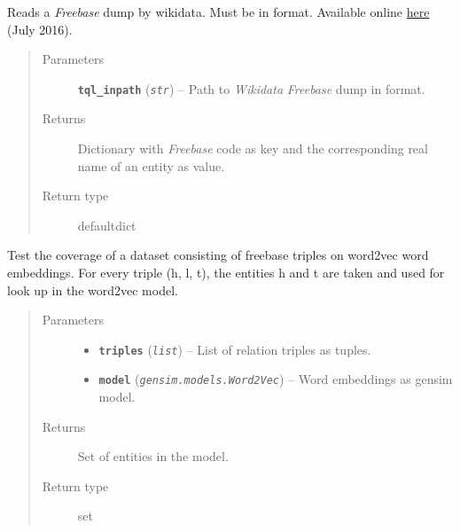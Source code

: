 \documentclass[letterpaper,10pt,english]{sphinxmanual}
\begin{document}

\begin{fulllineitems}
\label{src.trans_e:src.trans_e.trans_we.read_tql_file}
Reads a \emph{Freebase} dump by wikidata. Must be in  format. Available online
\href{https://developers.google.com/freebase/}{here} (July 2016).
\begin{quote}\begin{description}
\item[{Parameters}] \leavevmode
\textbf{\texttt{tql\_inpath}} (\emph{\texttt{str}}) -- Path to \emph{Wikidata} \emph{Freebase} dump in  format.

\item[{Returns}] \leavevmode
Dictionary with \emph{Freebase} code as key and the corresponding real name of an entity as value.

\item[{Return type}] \leavevmode
defaultdict

\end{description}\end{quote}

\end{fulllineitems}


\begin{fulllineitems}
\label{src.trans_e:src.trans_e.trans_we.test_coverage}
Test the coverage of a dataset consisting of freebase triples on word2vec word embeddings.
For every triple (h, l, t), the entities h and t are taken and used for look up in the word2vec
model.
\begin{quote}\begin{description}
\item[{Parameters}] \leavevmode\begin{itemize}
\item {} 
\textbf{\texttt{triples}} (\emph{\texttt{list}}) -- List of relation triples as tuples.

\item {} 
\textbf{\texttt{model}} (\emph{\texttt{gensim.models.Word2Vec}}) -- Word embeddings as gensim model.

\end{itemize}

\item[{Returns}] \leavevmode
Set of entities in the model.

\item[{Return type}] \leavevmode
set

\end{description}\end{quote}

\end{fulllineitems}
\end{document}
